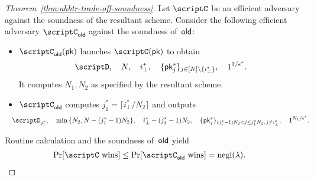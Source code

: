 \begin{proof}
[%
Theorem~\ref{thm:ahbtr-trade-off-soundness}]
Let $\scriptC$ be an efficient adversary against the soundness of the resultant scheme.
Consider the following efficient adversary $\scriptC_\OLD$ against the soundness of~$\OLD$:
\begin{itemize}
\item $\scriptC_\OLD(\pk)$ launches $\scriptC(\pk)$ to obtain
\begin{align*}
\scriptD,\quad
N,\quad
i^\ast_\bot,\quad
\{\pk^\ast_j\}_{j\in{[N]\setminus\{i^\ast_\bot\}}},\quad
1^{1/\epsilon^\ast}.
\end{align*}
It computes $N_1,N_2$ as specified by the resultant scheme.
\item $\scriptC_\OLD$ computes ${j^\ast_1=\lceil i^\ast_\bot/N_2\rceil}$
and outputs
\begin{align*}
\WideNarrow{\hspace*{-1em}}{}
\scriptD_{j^\ast_1},\quad
&{}\min{\{N_2,N-(j^\ast_1-1)N_2\}},\quad
i^\ast_\bot-(j^\ast_1-1)N_2,
\WideNarrow{\quad}{\\&}
\{\pk^\ast_j\}_{(j^\ast_1-1)N_2<j\leq j^\ast_1N_2,\,j\neq i^\ast_\bot},\quad
1^{N_1/\epsilon^\ast}.
\end{align*}
\end{itemize}
Routine calculation and the soundness of~$\OLD$ yield
\begin{align*}
\Pr[\scriptC\textup{ wins}]
&{}\leq
\Pr[\scriptC_\OLD\textup{ wins}]
=
\negl(\lambda).
\qedhere
\end{align*}
\end{proof}
